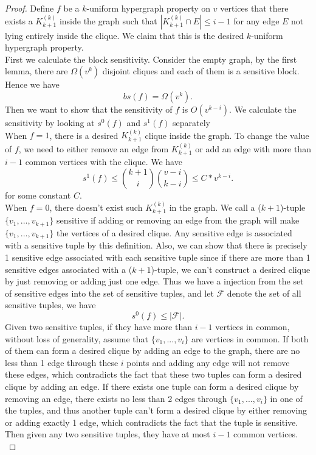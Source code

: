 \documentclass[psamsfonts]{amsart}
\theoremstyle{definition}
\theoremstyle{remark}
\numberwithin{equation}{section}
\begin{document}
	\begin{proof}
		Define $f$ be a $k$-uniform hypergraph property on $v$ vertices that there exists a $K_{k+1}^{(k)}$ inside the graph such that $|K_{k+1}^{(k)} \cap E| \leq  i-1$ for any edge $E$ not lying entirely inside the clique. We claim that this is the desired $k$-uniform hypergraph property.\\
		\indent First we calculate the block sensitivity. Consider the empty graph, by the first lemma, there are $\Omega (v^k)$ disjoint cliques and each of them is a sensitive block. Hence we have 
		\begin{equation}
			bs(f) = \Omega (v^k). \nonumber
		\end{equation}
		\indent Then we want to show that the sensitivity of $f$ is $O(v^{k-i})$. We calculate the sensitivity by looking at $s^0(f)$ and $s^1(f)$ separately\\
		\indent When $f=1$, there is a desired $K_{k+1}^{(k)}$ clique inside the graph. To change the value of $f$, we need to either remove an edge from $K_{k+1}^{(k)}$ or add an edge with more than $i-1$ common vertices with the clique. We have
		\begin{equation}
			s^1(f) \leq {k+1 \choose{i}}{v-i \choose{k-i}} \leq C*v^{k-i}. \nonumber
		\end{equation}
		for some constant $C$.\\
		\indent When $f=0$, there doesn't exist such $K_{k+1}^{(k)}$ in the graph. We call a ($k+1$)-tuple $\{v_1,...,v_{k+1}\}$ sensitive if adding or removing an edge from the graph will make $\{v_1,...,v_{k+1}\}$ the vertices of a desired clique. Any sensitive edge is associated with a sensitive tuple by this definition. Also, we can show that there is precisely 1 sensitive edge associated with each sensitive tuple since if there are more than 1 sensitive edges associated with a ($k+1$)-tuple, we can't construct a desired clique by just removing or adding just one edge. Thus we have a injection from the set of sensitive edges into the set of sensitive tuples, and let $\mathcal{F}$ denote the set of all sensitive tuples, we have
		\begin{equation}
			s^0(f) \leq |\mathcal{F}|. \nonumber
		\end{equation}
		\indent Given two sensitive tuples, if they have more than $i-1$ vertices in common, without loss of generality, assume that $\{v_1,...,v_i\}$ are vertices in common. If both of them can form a desired clique by adding an edge to the graph, there are no less than 1 edge through these $i$ points and adding any edge will not remove these edges, which contradicts the fact that these two tuples can form a desired clique by adding an edge. If there exists one tuple can form a desired clique by removing an edge, there exists no less than 2 edges through $\{v_1,...,v_i\}$ in one of the tuples, and thus another tuple can't form a desired clique by either removing or adding exactly 1 edge, which contradicts the fact that the tuple is sensitive. Then given any two sensitive tuples, they have at most $i-1$ common vertices.\\

\end{proof}
\end{document}
